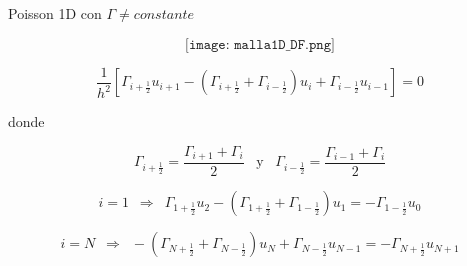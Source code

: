 \documentclass[handout]{beamer}
\begin{document}
\begin{frame}{Poisson 1D con $\Gamma \neq constante$}
	
{\small 

$$\texttt{[image: malla1D\_DF.png]}$$

\begin{displaymath}
\dfrac{1}{h^2} \left[
\Gamma_{i+\frac{1}{2}} u_{i+1} - 
(\Gamma_{i+\frac{1}{2}} + \Gamma_{i-\frac{1}{2}}) u_{i} +
\Gamma_{i-\frac{1}{2}} u_{i-1}
\right] = 0
\end{displaymath}

\pause

donde 

\begin{displaymath}
\Gamma_{i+\frac{1}{2}} = \dfrac{ \Gamma_{i+1} + \Gamma_{i}}{2} \,\,\, \text{ y } \,\,\,
\Gamma_{i-\frac{1}{2}} = \dfrac{ \Gamma_{i-1} + \Gamma_{i}}{2}
\end{displaymath}

\pause

\begin{displaymath}
i = 1 \,\,\, \Longrightarrow \,\,\,
\Gamma_{1+\frac{1}{2}} u_{2} - 
(\Gamma_{1+\frac{1}{2}} + \Gamma_{1-\frac{1}{2}}) u_{1} = - 
\Gamma_{1-\frac{1}{2}} u_{0}
\end{displaymath}

\begin{displaymath}
i = N \,\,\, \Longrightarrow \,\,\,
- (\Gamma_{N+\frac{1}{2}} + \Gamma_{N-\frac{1}{2}}) u_{N} +
\Gamma_{N-\frac{1}{2}} u_{N-1} = 
- \Gamma_{N+\frac{1}{2}} u_{N+1}
\end{displaymath}

}

\end{frame}
\end{document}
